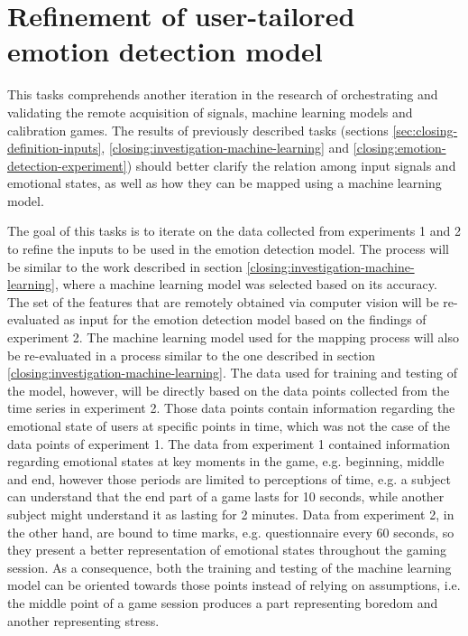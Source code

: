 \section{Refinement of user-tailored emotion detection model}

This tasks comprehends another iteration in the research of orchestrating and validating the remote acquisition of signals, machine learning models and calibration games. The results of previously described tasks (sections \ref{sec:closing-definition-inputs}, \ref{closing:investigation-machine-learning} and \ref{closing:emotion-detection-experiment}) should better clarify the relation among input signals and emotional states, as well as how they can be mapped using a machine learning model.

The goal of this tasks is to iterate on the data collected from experiments 1 and 2 to refine the inputs to be used in the emotion detection model. The process will be similar to the work described in section \ref{closing:investigation-machine-learning}, where a machine learning model was selected based on its accuracy. The set of the features that are remotely obtained via computer vision will be re-evaluated as input for the emotion detection model based on the findings of experiment 2. The machine learning model used for the mapping process will also be re-evaluated in a process similar to the one described in section \ref{closing:investigation-machine-learning}. The data used for training and testing of the model, however, will be directly based on the data points collected from the time series in experiment 2. Those data points contain information regarding the emotional state of users at specific points in time, which was not the case of the data points of experiment 1. The data from experiment 1 contained information regarding emotional states at key moments in the game, e.g. beginning, middle and end, however those periods are limited to perceptions of time, e.g. a subject can understand that the end part of a game lasts for 10 seconds, while another subject might understand it as lasting for 2 minutes. Data from experiment 2, in the other hand, are bound to time marks, e.g. questionnaire every 60 seconds, so they present a better representation of emotional states throughout the gaming session. As a consequence, both the training and testing of the machine learning model can be oriented towards those points instead of relying on assumptions, i.e. the middle point of a game session produces a part representing boredom and another representing stress.

